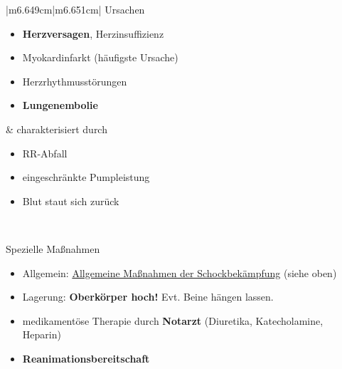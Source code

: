 \documentclass{article}
\newcommand\gEs[1]{\textbf{\textcolor[rgb]{0.0,0.0,0.5019608}{#1}}}
\newcommand\gEs[1]{\textbf{\textcolor[rgb]{0.0,0.0,0.5019608}{#1}}}
\newcommand\gZ[1]{\textcolor[rgb]{0.5019608,0.5019608,0.5019608}{#1}}
\begin{document}
\begin{center}
\tablehead{}\begin{supertabular}{|m{6.649cm}|m{6.651cm}|}
\hline
{\mdseries\color{black} Ursachen}

\begin{itemize}
\item {\mdseries \gEs{Herzversagen},
Herzinsuffizienz}

\end{itemize}
\begin{itemize}
\item {\mdseries Myokardinfarkt (h\"aufigste Ursache)}

\item {\mdseries Herzrhythmusst\"orungen}

\end{itemize}
\begin{itemize}
\item {\mdseries \gEs{Lungenembolie}}

\end{itemize}
 &
{\mdseries\color{black} charakterisiert durch}

\begin{itemize}
\item {\mdseries RR-Abfall}

\item {\mdseries eingeschr\"ankte Pumpleistung}

\end{itemize}
\begin{itemize}
\item {\mdseries Blut staut sich zur\"uck}

\end{itemize}
\\\hline
\end{supertabular}
\end{center}
{\mdseries\color{black}
Spezielle Ma{\ss}nahmen}

\begin{itemize}
\item {\mdseries\color[rgb]{0.0,0.0,0.5019608}
Allgemein:
\hyperlink{a761AllgemeineManahmenderSchockbekmpfungoutline}{Allgemeine
Ma{\ss}nahmen der Schockbek\"ampfung} (siehe oben) }

\item {\mdseries\color[rgb]{0.0,0.0,0.5019608}
Lagerung: \gEs{Oberk\"orper hoch!} Evt. Beine
h\"angen  lassen. }

\item {\mdseries\color[rgb]{0.0,0.0,0.5019608}
medikament\"ose Therapie durch \gEs{Notarzt} 
\gZ{(Diuretika, Katecholamine, Heparin)}}

\item {\mdseries\color[rgb]{0.0,0.0,0.5019608}
\gEs{Reanimationsbereitschaft}  }

\end{itemize}
\end{document}
